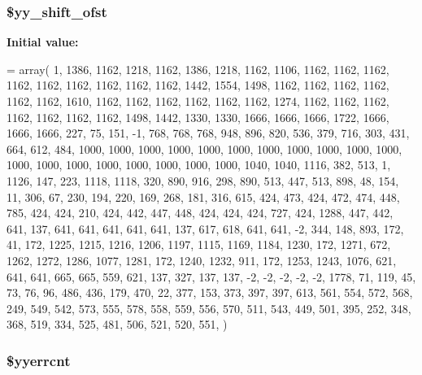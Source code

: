\subsubsection[{\$yy\+\_\+shift\+\_\+ofst}]{\setlength{\rightskip}{0pt plus 5cm}\$yy\+\_\+shift\+\_\+ofst\hspace{0.3cm}{\ttfamily [static]}}\label{class_smarty___internal___templateparser_a2209e68ce0fccc5f4739e063ee42ef0e}
{\bfseries Initial value\+:}
\begin{DoxyCode}
= array(
      1, 1386, 1162, 1218, 1162, 1386, 1218, 1162, 1106, 1162,
   1162, 1162, 1162, 1162, 1162, 1162, 1162, 1162, 1442, 1554,
   1498, 1162, 1162, 1162, 1162, 1162, 1162, 1610, 1162, 1162,
   1162, 1162, 1162, 1162, 1274, 1162, 1162, 1162, 1162, 1162,
   1162, 1162, 1498, 1442, 1330, 1330, 1666, 1666, 1666, 1722,
   1666, 1666, 1666,  227,   75,  151,   -1,  768,  768,  768,
    948,  896,  820,  536,  379,  716,  303,  431,  664,  612,
    484, 1000, 1000, 1000, 1000, 1000, 1000, 1000, 1000, 1000,
   1000, 1000, 1000, 1000, 1000, 1000, 1000, 1000, 1000, 1000,
   1040, 1040, 1116,  382,  513,    1, 1126,  147,  223, 1118,
   1118,  320,  890,  916,  298,  890,  513,  447,  513,  898,
     48,  154,   11,  306,   67,  230,  194,  220,  169,  268,
    181,  316,  615,  424,  473,  424,  472,  474,  448,  785,
    424,  424,  210,  424,  442,  447,  448,  424,  424,  424,
    727,  424, 1288,  447,  442,  641,  137,  641,  641,  641,
    641,  641,  137,  617,  618,  641,  641,   -2,  344,  148,
    893,  172,   41,  172, 1225, 1215, 1216, 1206, 1197, 1115,
   1169, 1184, 1230,  172, 1271,  672, 1262, 1272, 1286, 1077,
   1281,  172, 1240, 1232,  911,  172, 1253, 1243, 1076,  621,
    641,  641,  665,  665,  559,  621,  137,  327,  137,  137,
     -2,   -2,   -2,   -2,   -2, 1778,   71,  119,   45,   73,
     76,   96,  486,  436,  179,  470,   22,  377,  153,  373,
    397,  397,  613,  561,  554,  572,  568,  249,  549,  542,
    573,  555,  578,  558,  559,  556,  570,  511,  543,  449,
    501,  395,  252,  348,  368,  519,  334,  525,  481,  506,
    521,  520,  551,
)
\end{DoxyCode}
\hypertarget{class_smarty___internal___templateparser_a439c58ecabc9563ba54aca3735b2fb9d}{}
\subsubsection[{\$yyerrcnt}]{\setlength{\rightskip}{0pt plus 5cm}\$yyerrcnt}\label{class_smarty___internal___templateparser_a439c58ecabc9563ba54aca3735b2fb9d}
\hypertarget{class_smarty___internal___templateparser_a1fe6200bd9f9078edd70b829fd19d5ee}{}
